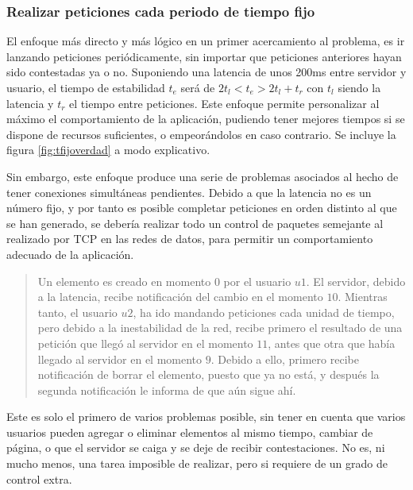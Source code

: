 \subsubsection{Realizar peticiones cada periodo de tiempo fijo} %
\label{ssub:nunca_tener_más_de_una_petición_pendiente}
El enfoque más directo y más lógico en un primer acercamiento al problema, es ir lanzando peticiones periódicamente, sin importar que peticiones anteriores hayan sido contestadas ya o no. Suponiendo una latencia de unos 200ms entre servidor y usuario, el tiempo de estabilidad $t_e$ será de $ 2t_l < t_e > 2t_l + t_r$ con $t_l$ siendo la latencia y $t_r$ el tiempo entre peticiones. Este enfoque permite personalizar al máximo el comportamiento de la aplicación, pudiendo tener mejores tiempos si se dispone de recursos suficientes, o empeorándolos en caso contrario. Se incluye la figura \ref{fig:tfijoverdad} a modo explicativo.

Sin embargo, este enfoque produce una serie de problemas asociados al hecho de tener conexiones simultáneas pendientes. Debido a que la latencia no es un número fijo, y por tanto es posible completar peticiones en orden distinto al que se han generado, se debería realizar todo un control de paquetes semejante al realizado por TCP en las redes de datos, para permitir un comportamiento adecuado de la aplicación.

\begin{quotation}
  Un elemento es creado en momento $0$ por el usuario $u1$. El servidor, debido a la latencia, recibe notificación del cambio en el momento $10$. Mientras tanto, el usuario $u2$, ha ido mandando peticiones cada unidad de tiempo, pero debido a la inestabilidad de la red, recibe primero el resultado de una petición que llegó al servidor en el momento $11$, antes que otra que había llegado al servidor en el momento $9$. Debido a ello, primero recibe notificación de borrar el elemento, puesto que ya no está, y después la segunda notificación le informa de que aún sigue ahí.
\end{quotation}

Este es solo el primero de varios problemas posible, sin tener en cuenta que varios usuarios pueden agregar o eliminar elementos al mismo tiempo, cambiar de página, o que el servidor se caiga y se deje de recibir contestaciones. No es, ni mucho menos, una tarea imposible de realizar, pero si requiere de un grado de control extra.

